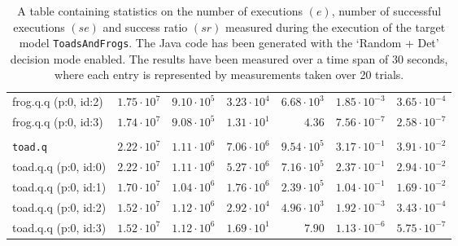\begin{table}[htbp]
{\begin{tabular}{lrrrrrr}
\hspace{3mm}frog.q.q (p:0, id:2)              &  $1.75 \cdot 10^{7}$ &  $9.10 \cdot 10^{5}$ &  $3.23 \cdot 10^{4}$ &  $6.68 \cdot 10^{3}$ & $1.85 \cdot 10^{-3}$ & $3.65 \cdot 10^{-4}$ \\
\hspace{3mm}frog.q.q (p:0, id:3)              &  $1.74 \cdot 10^{7}$ &  $9.08 \cdot 10^{5}$ &  $1.31 \cdot 10^{1}$ &               $4.36$ & $7.56 \cdot 10^{-7}$ & $2.58 \cdot 10^{-7}$ \\
\\[-8pt]\texttt{toad.q}                       &  $2.22 \cdot 10^{7}$ &  $1.11 \cdot 10^{6}$ &  $7.06 \cdot 10^{6}$ &  $9.54 \cdot 10^{5}$ & $3.17 \cdot 10^{-1}$ & $3.91 \cdot 10^{-2}$ \\
\hspace{3mm}toad.q.q (p:0, id:0)              &  $2.22 \cdot 10^{7}$ &  $1.11 \cdot 10^{6}$ &  $5.27 \cdot 10^{6}$ &  $7.16 \cdot 10^{5}$ & $2.37 \cdot 10^{-1}$ & $2.94 \cdot 10^{-2}$ \\
\hspace{3mm}toad.q.q (p:0, id:1)              &  $1.70 \cdot 10^{7}$ &  $1.04 \cdot 10^{6}$ &  $1.76 \cdot 10^{6}$ &  $2.39 \cdot 10^{5}$ & $1.04 \cdot 10^{-1}$ & $1.69 \cdot 10^{-2}$ \\
\hspace{3mm}toad.q.q (p:0, id:2)              &  $1.52 \cdot 10^{7}$ &  $1.12 \cdot 10^{6}$ &  $2.92 \cdot 10^{4}$ &  $4.96 \cdot 10^{3}$ & $1.92 \cdot 10^{-3}$ & $3.43 \cdot 10^{-4}$ \\
\hspace{3mm}toad.q.q (p:0, id:3)              &  $1.52 \cdot 10^{7}$ &  $1.12 \cdot 10^{6}$ &  $1.69 \cdot 10^{1}$ &               $7.90$ & $1.13 \cdot 10^{-6}$ & $5.75 \cdot 10^{-7}$ \\
\bottomrule
\end{tabular}
}
\caption{A table containing statistics on the number of executions $(e)$, number of successful executions $(se)$ and success ratio $(sr)$ measured during the execution of the target model \texttt{ToadsAndFrogs}. The Java code has been generated with the `Random + Det' decision mode enabled. The results have been measured over a time span of 30 seconds, where each entry is represented by measurements taken over 20 trials.}
\label{table:frequency_results_toadsandfrogs_random_det}
\end{table}